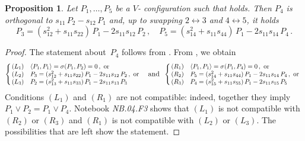 \documentclass[a4paper, 11pt, reqno]{amsart}
\theoremstyle{plain}
\newtheorem{prop}[lemma]{Proposition}
\theoremstyle{definition}
\newcommand{\nb}[2]{\textsl{{NB}.{#1}.{#2}}}
\newcommand\scalemath[2]{\scalebox{#1}{\mbox{\ensuremath{\displaystyle #2}}}}
\begin{document}
\begin{prop}
\label{proposition:char_rank_8}
  Let $P_1, \dotsc, P_5$ be a $V$- configuration such that  holds.
  Then $P_4$ is orthogonal to $s_{11} \, P_2 - s_{12} \, P_1$ and, up to swapping $2 \leftrightarrow 3$ and $4 \leftrightarrow 5$, it holds
  \[
   P_3 = (s_{12}^2+s_{11}s_{22}) \, P_1 - 2s_{11}s_{12} \, P_2 \,, \quad
   P_5 = (s_{14}^2+s_{11}s_{44}) \, P_1 - 2s_{11}s_{14} \, P_4 \,.
  \]
\end{prop}
\begin{proof}
  The statement about~$P_4$ follows from . 
  From , we obtain
  \[
  \left\{ \!\!
  \scalemath{0.9}{
  \begin{array}{ll}
  (L_1) & \left\langle P_1, P_1 \right\rangle = \sigma(P_1, P_2) = 0 \,, \text{ or} \\
  (L_2) & P_3 = (s_{12}^2+s_{11}s_{22}) \, P_1 - 2s_{11}s_{12} \, P_2 \,, \text{ or} \\
  (L_3) & P_2 = (s_{13}^2+s_{11}s_{33}) \, P_1 - 2s_{11}s_{13} \, P_3
  \end{array}
  }
  \right.
  \;\; \text{and} \;\;
  \left\{ \!\!
  \scalemath{0.9}{
  \begin{array}{ll}
  (R_1) & \left\langle P_1, P_1 \right\rangle = \sigma(P_1, P_4) = 0 \,, \text{ or} \\
  (R_2) & P_5 = (s_{14}^2+s_{11}s_{44}) \, P_1 - 2s_{11}s_{14} \, P_4 \,, \text{ or} \\
  (R_3) & P_4 = (s_{15}^2+s_{11}s_{55}) \, P_1 - 2s_{11}s_{15} \, P_5
  \end{array}
  }
  \right.
  \]
  Conditions $(L_1)$ and $(R_1)$ are not compatible: indeed, together they imply $P_1 \vee P_2 = P_1 \vee P_4$. 
  Notebook \nb{04}{F3} shows that $(L_1)$ is not compatible with $(R_2)$ or $(R_3)$ and $(R_1)$ is not compatible with $(L_2)$ or $(L_3)$.
  The possibilities that are left show the statement.
\end{proof}
\end{document}
